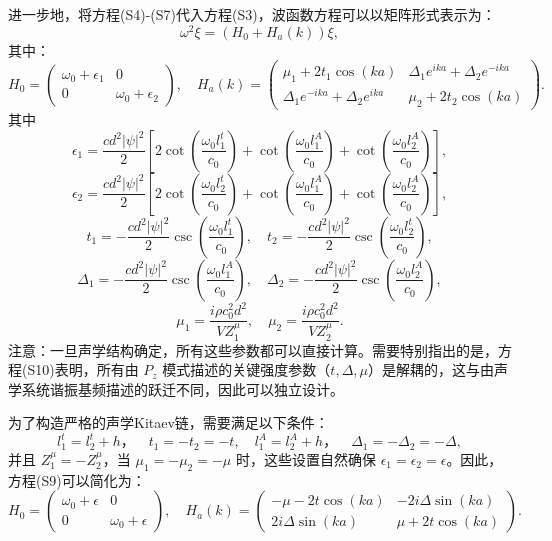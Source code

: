 进一步地，将方程(S4)-(S7)代入方程(S3)，波函数方程可以以矩阵形式表示为：
\[
\omega^2 \xi = (H_0 + H_a(k)) \xi, 
\]
其中：
\[
H_0 =
\begin{pmatrix}
\omega_0 + \epsilon_1 & 0 \\
0 & \omega_0 + \epsilon_2
\end{pmatrix},
\quad
H_a(k) =
\begin{pmatrix}
\mu_1 + 2t_1\cos(ka) & \Delta_1 e^{ika} + \Delta_2 e^{-ika} \\
\Delta_1 e^{-ika} + \Delta_2 e^{ika} & \mu_2 + 2t_2\cos(ka)
\end{pmatrix}. 
\]
其中
\[
\epsilon_1 = \frac{cd^2 |\psi|^2}{2} \left[ 2\cot\left(\frac{\omega_0 l_1^t}{c_0}\right) + \cot\left(\frac{\omega_0 l_1^A}{c_0}\right) + \cot\left(\frac{\omega_0 l_2^A}{c_0}\right) \right],
\]
\[
\epsilon_2 = \frac{cd^2 |\psi|^2}{2} \left[ 2\cot\left(\frac{\omega_0 l_2^t}{c_0}\right) + \cot\left(\frac{\omega_0 l_1^A}{c_0}\right) + \cot\left(\frac{\omega_0 l_2^A}{c_0}\right) \right],
\]
\[
t_1 = -\frac{cd^2 |\psi|^2}{2} \csc\left(\frac{\omega_0 l_1^t}{c_0}\right), \quad
t_2 = -\frac{cd^2 |\psi|^2}{2} \csc\left(\frac{\omega_0 l_2^t}{c_0}\right),
\]
\[
\Delta_1 = -\frac{cd^2 |\psi|^2}{2} \csc\left(\frac{\omega_0 l_1^A}{c_0}\right), \quad
\Delta_2 = -\frac{cd^2 |\psi|^2}{2} \csc\left(\frac{\omega_0 l_2^A}{c_0}\right),
\]
\[
\mu_1 = \frac{i\rho c_0^2 d^2}{V Z_1^\mu}, \quad
\mu_2 = \frac{i\rho c_0^2 d^2}{V Z_2^\mu}. 
\]
注意：一旦声学结构确定，所有这些参数都可以直接计算。需要特别指出的是，方程(S10)表明，所有由 \( P_z \) 模式描述的关键强度参数（\( t, \Delta, \mu \)）是解耦的，这与由声学系统谐振基频描述的跃迁不同，因此可以独立设计。

为了构造严格的声学Kitaev链，需要满足以下条件：
\[
l_1^t = l_2^t + h， \quad t_1 = -t_2 = -t, \quad
l_1^A = l_2^A + h，\quad \Delta_1 = -\Delta_2 = -\Delta,
\]
并且 \( Z_1^\mu = -Z_2^\mu \)，当 \( \mu_1 = -\mu_2 = -\mu \) 时，这些设置自然确保 \( \epsilon_1 = \epsilon_2 = \epsilon \)。因此，方程(S9)可以简化为：
\[
H_0 =
\begin{pmatrix}
\omega_0 + \epsilon & 0 \\
0 & \omega_0 + \epsilon
\end{pmatrix},
\quad
H_a(k) =
\begin{pmatrix}
-\mu - 2t\cos(ka) & -2i\Delta\sin(ka) \\
2i\Delta\sin(ka) & \mu + 2t\cos(ka)
\end{pmatrix}. 
\]
